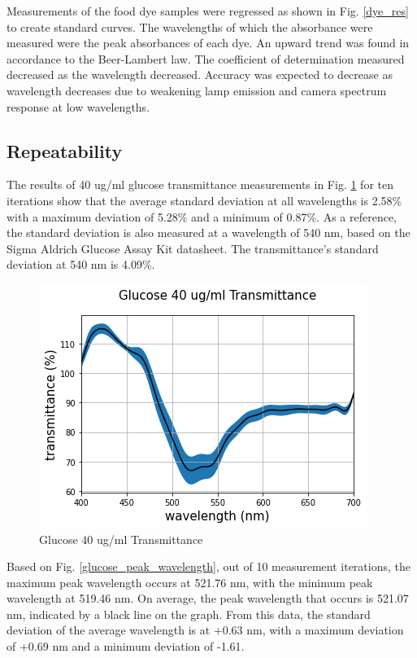 \documentclass[conference]{IEEEtran}
\begin{document}
Measurements of the food dye samples were regressed as shown in Fig. \ref{dye_res} to create standard curves.
The wavelengths of which the absorbance were measured were the peak absorbances of each dye.
An upward trend was found in accordance to the Beer-Lambert law.
The coefficient of determination measured decreased as the wavelength decreased.
Accuracy was expected to decrease as wavelength decreases due to weakening lamp emission and camera spectrum response at low wavelengths.

\subsection{Repeatability}

The results of 40 ug/ml glucose transmittance measurements in Fig. \ref{glucose_transmittance_all} for ten iterations show that the average standard deviation at all wavelengths is 2.58\% with a maximum deviation of 5.28\% and a minimum of 0.87\%.
As a reference, the standard deviation is also measured at a wavelength of 540 nm, based on the Sigma Aldrich Glucose Assay Kit datasheet.
The transmittance's standard deviation at 540 nm is 4.09\%. 

\begin{figure}[htbp]
    \centerline{\includegraphics[scale=0.5]{glucosetransmittanceALL.png}}
    \caption{Glucose 40 ug/ml Transmittance}
    \label{glucose_transmittance_all}
    \end{figure}

Based on Fig. \ref{glucose_peak_wavelength}, out of 10 measurement iterations, the maximum peak wavelength occurs at 521.76 nm, with the minimum peak wavelength at 519.46 nm.
On average, the peak wavelength that occurs is 521.07 nm, indicated by a black line on the graph.
From this data, the standard deviation of the average wavelength is at +0.63 nm, with a maximum deviation of +0.69 nm and a minimum deviation of -1.61.
\end{document}
